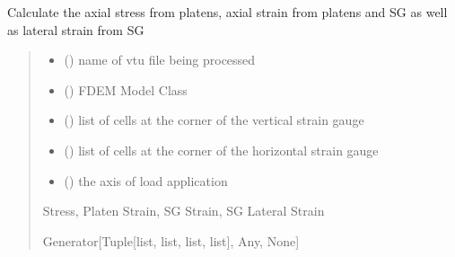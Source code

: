 \documentclass[letterpaper,10pt,english]{sphinxmanual}
\begin{document}
\begin{fulllineitems}
\label{\detokenize{pyfdempp:pyfdempp.complete_UCS_thread_pool_generators.history_strain_func}}
\pysigstartsignatures
{}
\pysigstopsignatures
\sphinxAtStartPar
Calculate the axial stress from platens, axial strain from platens and SG as well as lateral strain from SG
\begin{quote}\begin{description}
\begin{itemize}
\item {} 
\sphinxAtStartPar
{} () \textendash{} name of vtu file being processed

\item {} 
\sphinxAtStartPar
{} () \textendash{} FDEM Model Class

\item {} 
\sphinxAtStartPar
{} (\sphinxstyleliteralemphasis{\sphinxupquote{{[}}}\sphinxstyleliteralemphasis{\sphinxupquote{{]}}}) \textendash{} list of cells at the corner of the vertical strain gauge

\item {} 
\sphinxAtStartPar
{} (\sphinxstyleliteralemphasis{\sphinxupquote{{[}}}\sphinxstyleliteralemphasis{\sphinxupquote{{]}}}) \textendash{} list of cells at the corner of the horizontal strain gauge

\item {} 
\sphinxAtStartPar
{} (\sphinxstyleliteralemphasis{\sphinxupquote{{[}}}\sphinxstyleliteralemphasis{\sphinxupquote{{]}}}) \textendash{} the axis of load application

\end{itemize}

\sphinxAtStartPar
Stress, Platen Strain, SG Strain, SG Lateral Strain

\sphinxAtStartPar
Generator{[}Tuple{[}list, list, list, list{]}, Any, None{]}

\end{description}\end{quote}

\end{fulllineitems}
\end{document}
